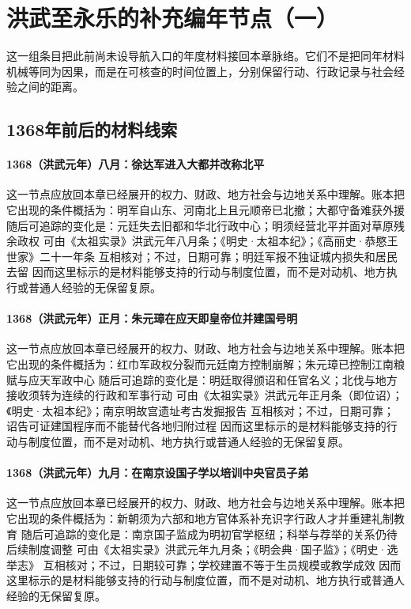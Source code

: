\section{洪武至永乐的补充编年节点（一）}
这一组条目把此前尚未设导航入口的年度材料接回本章脉络。它们不是把同年材料机械等同为因果，而是在可核查的时间位置上，分别保留行动、行政记录与社会经验之间的距离。

\subsection{1368年前后的材料线索}

\paragraph{1368（洪武元年）八月：徐达军进入大都并改称北平} 这一节点应放回本章已经展开的权力、财政、地方社会与边地关系中理解。账本把它出现的条件概括为：明军自山东、河南北上且元顺帝已北撤；大都守备难获外援 随后可追踪的变化是：元廷失去旧都和华北行政中心；明须经营北平并面对草原残余政权 可由《太祖实录》洪武元年八月条；《明史·太祖本纪》；《高丽史·恭愍王世家》二十一年条 互相核对；不过，日期可靠；明廷军报不独证城内损失和居民去留 因而这里标示的是材料能够支持的行动与制度位置，而不是对动机、地方执行或普通人经验的无保留复原。

\paragraph{1368（洪武元年）正月：朱元璋在应天即皇帝位并建国号明} 这一节点应放回本章已经展开的权力、财政、地方社会与边地关系中理解。账本把它出现的条件概括为：红巾军政权分裂而元廷南方控制崩解；朱元璋已控制江南粮赋与应天军政中心 随后可追踪的变化是：明廷取得颁诏和任官名义；北伐与地方接收须转为连续的行政和军事行动 可由《太祖实录》洪武元年正月条（即位诏）；《明史·太祖本纪》；南京明故宫遗址考古发掘报告 互相核对；不过，日期可靠；诏告可证建国程序而不能替代各地归附过程 因而这里标示的是材料能够支持的行动与制度位置，而不是对动机、地方执行或普通人经验的无保留复原。

\paragraph{1368（洪武元年）九月：在南京设国子学以培训中央官员子弟} 这一节点应放回本章已经展开的权力、财政、地方社会与边地关系中理解。账本把它出现的条件概括为：新朝须为六部和地方官体系补充识字行政人才并重建礼制教育 随后可追踪的变化是：南京国子监成为明初官学枢纽；科举与荐举的关系仍待后续制度调整 可由《太祖实录》洪武元年九月条；《明会典·国子监》；《明史·选举志》 互相核对；不过，日期较可靠；学校建置不等于生员规模或教学成效 因而这里标示的是材料能够支持的行动与制度位置，而不是对动机、地方执行或普通人经验的无保留复原。

